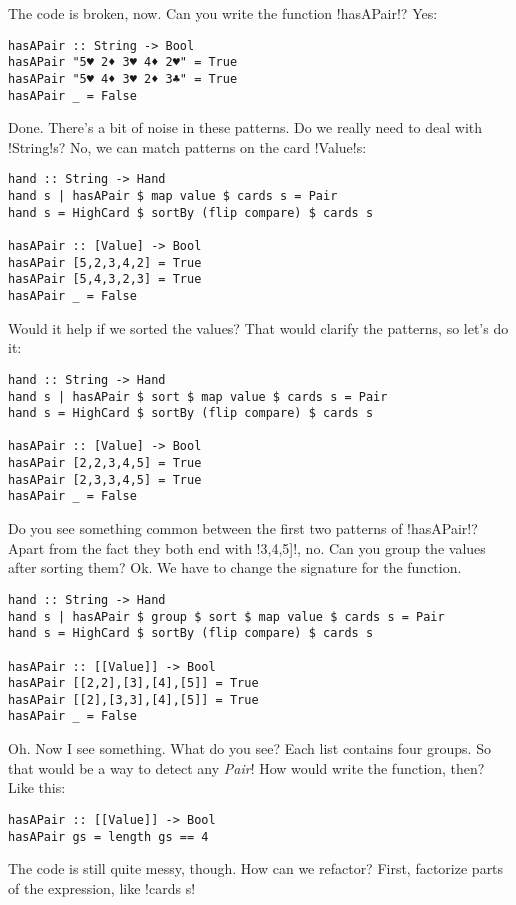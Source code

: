 \error The code is broken, now.
\lhN Can you write the function \il!hasAPair!?
\lhA Yes:
\begin{lstlisting}[frame=single]
hasAPair :: String -> Bool
hasAPair "5♥ 2♦ 3♥ 4♦ 2♥" = True 
hasAPair "5♥ 4♦ 3♥ 2♦ 3♣" = True
hasAPair _ = False
\end{lstlisting}
\success Done.
\lhN There's a bit of noise in these patterns. Do we really need to deal with \il!String!s?
\lhA \success No, we can match patterns on the card \il!Value!s:
\begin{lstlisting}[frame=single]
hand :: String -> Hand
hand s | hasAPair $ map value $ cards s = Pair
hand s = HighCard $ sortBy (flip compare) $ cards s

hasAPair :: [Value] -> Bool
hasAPair [5,2,3,4,2] = True 
hasAPair [5,4,3,2,3] = True
hasAPair _ = False
\end{lstlisting}
\lhN Would it help if we sorted the values?
\lhA \success That would clarify the patterns, so let's do it:
\begin{lstlisting}[frame=single]
hand :: String -> Hand
hand s | hasAPair $ sort $ map value $ cards s = Pair
hand s = HighCard $ sortBy (flip compare) $ cards s

hasAPair :: [Value] -> Bool
hasAPair [2,2,3,4,5] = True 
hasAPair [2,3,3,4,5] = True
hasAPair _ = False
\end{lstlisting} %
\lhN Do you see something common between the first two patterns of \il!hasAPair!?
\lhA Apart from the fact they both end with \il!3,4,5]!, no.
\lhN Can you group the values after sorting them?
\lhA \success Ok. We have to change the signature for the function.
\begin{lstlisting}[frame=single]
hand :: String -> Hand
hand s | hasAPair $ group $ sort $ map value $ cards s = Pair
hand s = HighCard $ sortBy (flip compare) $ cards s

hasAPair :: [[Value]] -> Bool
hasAPair [[2,2],[3],[4],[5]] = True 
hasAPair [[2],[3,3],[4],[5]] = True
hasAPair _ = False
\end{lstlisting}
\success Oh. Now I see something.
\lhN What do you see?
\lhA Each list contains four groups. So that would be a way to detect any \emph{Pair}!
\lhN How would write the function, then?
\lhA \success Like this:
\begin{lstlisting}[frame=single]
hasAPair :: [[Value]] -> Bool
hasAPair gs = length gs == 4 
\end{lstlisting}
\success The code is still quite messy, though.
\lhN How can we refactor?
\lhA First, factorize parts of the expression, like \il!cards s!   
